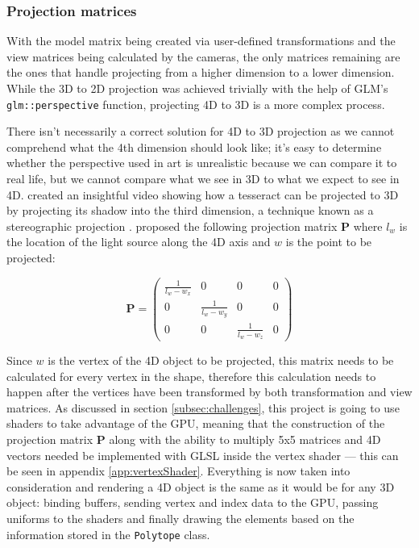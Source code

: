 \documentclass[11pt, a4paper]{article}
\begin{document}
\subsubsection{Projection matrices}

With the model matrix being created via user-defined transformations and the view matrices being calculated by the cameras, the only matrices remaining are the ones that handle projecting from a higher dimension to a lower dimension. While the 3D to 2D projection was achieved trivially with the help of GLM's \texttt{glm::perspective} function, projecting 4D to 3D is a more complex process. 

There isn't necessarily a correct solution for 4D to 3D projection as we cannot comprehend what the 4th dimension should look like; it's easy to determine whether the perspective used in art is unrealistic because we can compare it to real life, but we cannot compare what we see in 3D to what we expect to see in 4D. \citeauthor{schloss2016understanding} created an insightful video showing how a tesseract can be projected to 3D by projecting its shadow into the third dimension, a technique known as a stereographic projection \parencite*[2:42]{schloss2016understanding}. \citeauthor{schloss2016understanding} proposed the following projection matrix $\textbf{P}$ where $l_w$ is the location of the light source along the 4D axis and $w$ is the point to be projected:

\begin{equation*}
  \textbf{P} =
  \begin{pmatrix}
    \frac{1}{l_w - w_x} & 0 & 0 & 0 \\
    0 & \frac{1}{l_w - w_y} & 0 & 0 \\
    0 & 0 & \frac{1}{l_w - w_z} & 0
  \end{pmatrix}
\end{equation*}

Since $w$ is the vertex of the 4D object to be projected, this matrix needs to be calculated for every vertex in the shape, therefore this calculation needs to happen after the vertices have been transformed by both transformation and view matrices. As discussed in section \ref{subsec:challenges}, this project is going to use shaders to take advantage of the GPU, meaning that the construction of the projection matrix $\textbf{P}$ along with the ability to multiply 5x5 matrices and 4D vectors needed be implemented with GLSL inside the vertex shader --- this can be seen in appendix \ref{app:vertexShader}. Everything is now taken into consideration and rendering a 4D object is the same as it would be for any 3D object: binding buffers, sending vertex and index data to the GPU, passing uniforms to the shaders and finally drawing the elements based on the information stored in the \texttt{Polytope} class.
\end{document}
